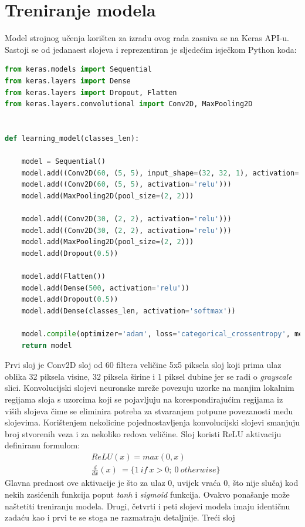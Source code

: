 \documentclass[times, utf8, zavrsni]{fer}
\begin{document}
\section{Treniranje modela}
Model strojnog učenja korišten za izradu ovog rada zasniva se na Keras API-u.
Sastoji se od jedanaest slojeva i reprezentiran je sljedećim isječkom Python koda:
\begin{lstlisting}[language=Python]
from keras.models import Sequential
from keras.layers import Dense
from keras.layers import Dropout, Flatten
from keras.layers.convolutional import Conv2D, MaxPooling2D


def learning_model(classes_len):

    model = Sequential()
    model.add((Conv2D(60, (5, 5), input_shape=(32, 32, 1), activation='relu')))
    model.add((Conv2D(60, (5, 5), activation='relu')))
    model.add(MaxPooling2D(pool_size=(2, 2)))

    model.add((Conv2D(30, (2, 2), activation='relu')))
    model.add((Conv2D(30, (2, 2), activation='relu')))
    model.add(MaxPooling2D(pool_size=(2, 2)))
    model.add(Dropout(0.5))

    model.add(Flatten())
    model.add(Dense(500, activation='relu'))
    model.add(Dropout(0.5))
    model.add(Dense(classes_len, activation='softmax'))

    model.compile(optimizer='adam', loss='categorical_crossentropy', metrics=['accuracy'])
    return model
\end{lstlisting}

Prvi sloj je Conv2D sloj od 60 filtera veličine 5x5 piksela sloj koji prima ulaz oblika 32 piksela visine, 32 piksela širine i 1 piksel dubine jer se radi o \emph{grayscale} slici.
Konvolucijski slojevi neuronske mreže povezuju uzorke na manjim lokalnim regijama sloja s uzorcima koji se pojavljuju na korespondirajućim regijama iz viših slojeva čime se eliminira potreba za stvaranjem potpune povezanosti među slojevima. \citep{8308186}
Korištenjem nekolicine pojednostavljenja konvolucijski slojevi smanjuju broj stvorenih veza i za nekoliko redova veličine.\citep{turner2014lecture}
Sloj koristi ReLU aktivaciju definiranu formulom: \begin{align*} &ReLU(x)= max(0,x)\\ &\frac{d}{dx}(x)\ = \{1\ if\ x>0;\ 0\ otherwise\} \end{align*}
Glavna prednost ove aktivacije je što za ulaz 0, uvijek vraća 0, što nije slučaj kod nekih zasićenih funkcija poput \emph{tanh} i \emph{sigmoid} funkcija. Ovakvo ponašanje može naštetiti treniranju modela.
Drugi, četvrti i peti slojevi modela imaju identičnu zadaću kao i prvi te se stoga ne razmatraju detaljnije.
Treći sloj
\end{document}
